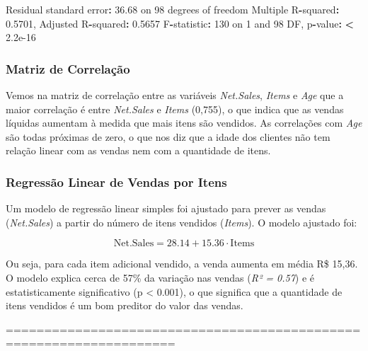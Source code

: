 \documentclass[
]{article}
\newenvironment{Shaded}{\begin{snugshade}}{\end{snugshade}}
\newcommand{\DecValTok}[1]{\textcolor[rgb]{0.00,0.00,0.81}{#1}}
\newcommand{\ErrorTok}[1]{\textcolor[rgb]{0.64,0.00,0.00}{\textbf{#1}}}
\newcommand{\FloatTok}[1]{\textcolor[rgb]{0.00,0.00,0.81}{#1}}
\newcommand{\NormalTok}[1]{#1}
\newcommand{\SpecialCharTok}[1]{\textcolor[rgb]{0.81,0.36,0.00}{\textbf{#1}}}
\begin{document}
\begin{Shaded}
\begin{Highlighting}[]
\NormalTok{Residual standard error}\SpecialCharTok{:} \FloatTok{36.68}\NormalTok{ on }\DecValTok{98}\NormalTok{ degrees of freedom}
\NormalTok{Multiple R}\SpecialCharTok{{-}}\NormalTok{squared}\SpecialCharTok{:}  \FloatTok{0.5701}\NormalTok{,    Adjusted R}\SpecialCharTok{{-}}\NormalTok{squared}\SpecialCharTok{:}  \FloatTok{0.5657} 
\NormalTok{F}\SpecialCharTok{{-}}\NormalTok{statistic}\SpecialCharTok{:}   \DecValTok{130}\NormalTok{ on }\DecValTok{1}\NormalTok{ and }\DecValTok{98}\NormalTok{ DF,  p}\SpecialCharTok{{-}}\NormalTok{value}\SpecialCharTok{:} \ErrorTok{\textless{}} \FloatTok{2.2e{-}16}
\end{Highlighting}
\end{Shaded}

\subsubsection{Matriz de Correlação}\label{matriz-de-correlauxe7uxe3o}

Vemos na matriz de correlação entre as variáveis \emph{Net.Sales},
\emph{Items} e \emph{Age} que a maior correlação é entre
\emph{Net.Sales} e \emph{Items} (0,755), o que indica que as vendas
líquidas aumentam à medida que mais itens são vendidos. As correlações
com \emph{Age} são todas próximas de zero, o que nos diz que a idade dos
clientes não tem relação linear com as vendas nem com a quantidade de
itens.

\subsubsection{Regressão Linear de Vendas por
Itens}\label{regressuxe3o-linear-de-vendas-por-itens}

Um modelo de regressão linear simples foi ajustado para prever as vendas
(\emph{Net.Sales}) a partir do número de itens vendidos (\emph{Items}).
O modelo ajustado foi:

\[
\text{Net.Sales} = 28.14 + 15.36 \cdot \text{Items}
\]

Ou seja, para cada item adicional vendido, a venda aumenta em média R\$
15,36. O modelo explica cerca de 57\% da variação nas vendas (\emph{R² =
0.57}) e é estatisticamente significativo (p \textless{} 0.001), o que
significa que a quantidade de itens vendidos é um bom preditor do valor
das vendas.

====================================================================
\end{document}
